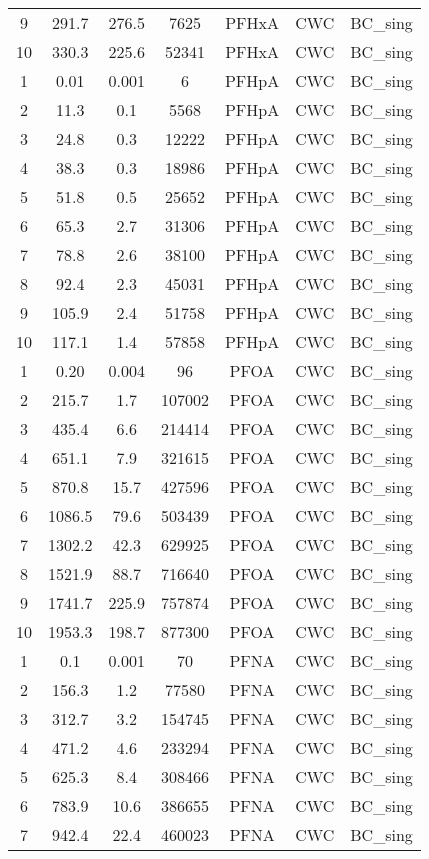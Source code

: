\begin{longtable}[c]{ccccccc}
9 & 291.7 & 276.5 & 7625 & PFHxA & CWC & BC\_sing \\
10 & 330.3 & 225.6 & 52341 & PFHxA & CWC & BC\_sing \\
1 & 0.01 & 0.001 & 6 & PFHpA & CWC & BC\_sing \\
2 & 11.3 & 0.1 & 5568 & PFHpA & CWC & BC\_sing \\
3 & 24.8 & 0.3 & 12222 & PFHpA & CWC & BC\_sing \\
4 & 38.3 & 0.3 & 18986 & PFHpA & CWC & BC\_sing \\
5 & 51.8 & 0.5 & 25652 & PFHpA & CWC & BC\_sing \\
6 & 65.3 & 2.7 & 31306 & PFHpA & CWC & BC\_sing \\
7 & 78.8 & 2.6 & 38100 & PFHpA & CWC & BC\_sing \\
8 & 92.4 & 2.3 & 45031 & PFHpA & CWC & BC\_sing \\
9 & 105.9 & 2.4 & 51758 & PFHpA & CWC & BC\_sing \\
10 & 117.1 & 1.4 & 57858 & PFHpA & CWC & BC\_sing \\
1 & 0.20 & 0.004 & 96 & PFOA & CWC & BC\_sing \\
2 & 215.7 & 1.7 & 107002 & PFOA & CWC & BC\_sing \\
3 & 435.4 & 6.6 & 214414 & PFOA & CWC & BC\_sing \\
4 & 651.1 & 7.9 & 321615 & PFOA & CWC & BC\_sing \\
5 & 870.8 & 15.7 & 427596 & PFOA & CWC & BC\_sing \\
6 & 1086.5 & 79.6 & 503439 & PFOA & CWC & BC\_sing \\
7 & 1302.2 & 42.3 & 629925 & PFOA & CWC & BC\_sing \\
8 & 1521.9 & 88.7 & 716640 & PFOA & CWC & BC\_sing \\
9 & 1741.7 & 225.9 & 757874 & PFOA & CWC & BC\_sing \\
10 & 1953.3 & 198.7 & 877300 & PFOA & CWC & BC\_sing \\
1 & 0.1 & 0.001 & 70 & PFNA & CWC & BC\_sing \\
2 & 156.3 & 1.2 & 77580 & PFNA & CWC & BC\_sing \\
3 & 312.7 & 3.2 & 154745 & PFNA & CWC & BC\_sing \\
4 & 471.2 & 4.6 & 233294 & PFNA & CWC & BC\_sing \\
5 & 625.3 & 8.4 & 308466 & PFNA & CWC & BC\_sing \\
6 & 783.9 & 10.6 & 386655 & PFNA & CWC & BC\_sing \\
7 & 942.4 & 22.4 & 460023 & PFNA & CWC & BC\_sing \\

\end{longtable}
